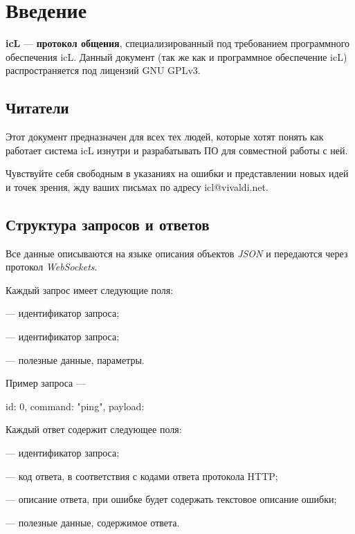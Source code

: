 \section{Введение}

\textbf{icL} — \textbf{протокол общения}, специализированный под требованием программного обеспечения icL. Данный документ (так же как и программное обеспечение icL) распространяется под лицензий GNU GPLv3.

\subsection{Читатели}

Этот документ предназначен для всех тех людей, которые хотят понять как работает система icL изнутри и разрабатывать ПО для совместной работы с ней.

Чувствуйте себя свободным в указаниях на ошибки и представлении новых идей и точек зрения, жду ваших письмах по адресу icl@vivaldi.net.

\subsection{Структура запросов и ответов}

Все данные описываются на языке описания объектов \textit{JSON} и передаются через протокол \textit{WebSockets}.

Каждый запрос имеет следующие поля:
\begin{icItems}
	\item {} — идентификатор запроса;
	\item {} — идентификатор запроса;
	\item {} — полезные данные, параметры.
\end{icItems}

Пример запроса —
\begin{jscode}
{
	id: 0,
	command: "ping",
	payload: {}
}
\end{jscode}

Каждый ответ содержит следующее поля:
\begin{icItems}
	\item {} — идентификатор запроса;
	\item {} — код ответа, в соответствия с кодами ответа протокола HTTP;
	\item {} — описание ответа, при ошибке будет содержать текстовое описание ошибки;
	\item {} — полезные данные, содержимое ответа.
\end{icItems}

